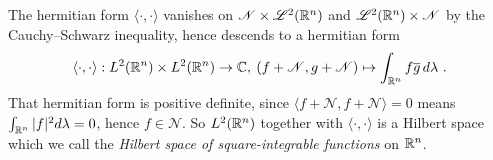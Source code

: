 \begin{examples}
\begin{environmentlist}
      The hermitian form $\langle \cdot , \cdot  \rangle $ vanishes on $\mathscr{N} \times  \mathscr{L}^2(\mathbb{R}^n)$ and 
      $\mathscr{L}^2(\mathbb{R}^n) \times \mathscr{N}$ by the Cauchy--Schwarz inequality, hence descends to a hermitian form
      \[
        \langle \cdot , \cdot \rangle : L^2(\mathbb{R}^n) \times  L^2(\mathbb{R}^n) \to \mathbb{C}, \:
        (f + \mathscr{N} ,g+ \mathscr{N}) \mapsto \int_{\mathbb{R}^n}f\overline{g}\, d\lambda \ .
      \]
      That hermitian form is positive definite, since 
      $\langle f + \mathscr{N}, f + \mathscr{N} \rangle = 0$ means 
      $ \int_{\mathbb{R}^n}|f|^2 d\lambda =0$, hence $f\in \mathscr{N}$.
      So $L^2(\mathbb{R}^n)$ together with $\langle \cdot , \cdot \rangle $ is a 
      Hilbert space which we call the 
      \emph{Hilbert space of square-integrable functions} on $\mathbb{R}^n$. 
\end{environmentlist}
\end{examples}


